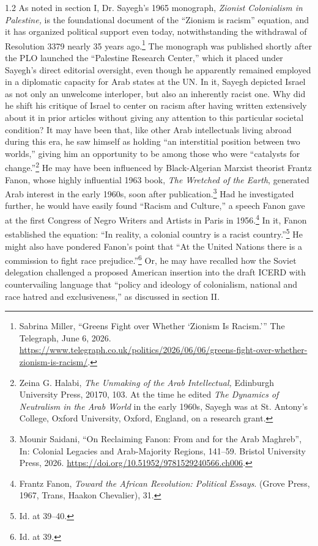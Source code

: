 \documentclass[../unravbook.tex]{subfiles}
\begin{document}
\begin{spacing}{1.2}
As noted in section I, Dr. Sayegh's 1965 monograph, \textit{Zionist Colonialism in Palestine,} is the foundational document of the \enquote{Zionism is racism} equation, and it has organized political support even today, notwithstanding the withdrawal of Resolution 3379 nearly 35 years ago.\footnote{Sabrina Miller, \enquote{Greens Fight over Whether \enquote*{Zionism Is Racism.}} The Telegraph, June 6, 2026. \url{https://www.telegraph.co.uk/politics/2026/06/06/greens-fight-over-whether-zionism-is-racism/}.} The monograph was published shortly after the PLO launched the ``Palestine Research Center,'' which it placed under Sayegh's direct editorial oversight, even though he apparently remained employed in a diplomatic capacity for Arab states at the UN. In it, Sayegh depicted Israel as not only an unwelcome interloper, but also an inherently racist one. Why did he shift his critique of Israel to center on racism after having written extensively about it in prior articles without giving any attention to this particular societal condition? It may have been that, like other Arab intellectuals living abroad during this era, he saw himself as holding \enquote{an interstitial position between two worlds,} giving him an opportunity to be among those who were \enquote{catalysts for change.}\footnote{Zeina G. Halabi, \textit{The Unmaking of the Arab Intellectual,} Edinburgh University Press, 20170, 103.  At the time he edited \textit{The Dynamics of Neutralism in the Arab World} in the early 1960s, Sayegh was at St. Antony's College, Oxford University, Oxford, England, on a research grant.} He may have been influenced by Black-Algerian Marxist theorist Frantz Fanon, whose highly influential 1963 book, \textit{The Wretched of the Earth}, generated Arab interest in the early 1960s, soon after publication.\footnote{
Mounir Saidani, \enquote{On Reclaiming Fanon: From and for the Arab Maghreb}, In: Colonial Legacies and Arab-Majority Regions, 141--59. Bristol University Press, 2026. \url{https://doi.org/10.51952/9781529240566.ch006}.} Had he investigated further, he would have easily found \enquote{Racism and Culture,} a speech Fanon gave at the first Congress of Negro Writers and Artists in Paris in 1956.\footnote{Frantz Fanon, \textit{Toward the African Revolution: Political Essays}. (Grove Press, 1967, Trans, Haakon Chevalier), 31.} In it, Fanon established the equation: \enquote{In reality, a colonial country is a racist country.}\footnote{Id. at 39--40.} He might also have pondered Fanon's point that \enquote{At the United Nations there is a commission to fight race prejudice.}\footnote{Id. at 39.} Or, he may have recalled how the Soviet delegation challenged a proposed American insertion into the draft ICERD with countervailing language that \enquote{policy and ideology of colonialism, national and race hatred and exclusiveness,} as discussed in section II.


\end{spacing}
\end{document}
